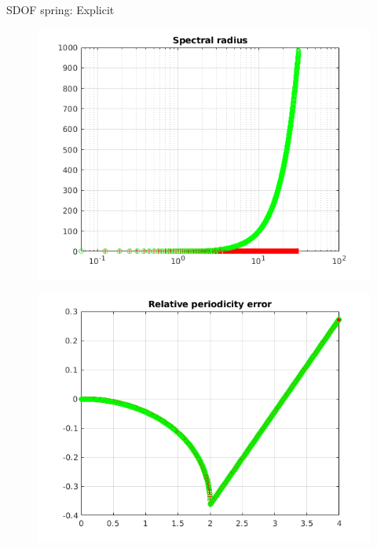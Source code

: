\begin{frame}{SDOF spring: Explicit}
\begin{figure}[ht]
\begin{minipage}[b]{0.5\linewidth}
  \end{minipage}%
  \begin{minipage}[b]{0.5\linewidth}
    \centering
    \includegraphics[scale=.35]{images/sdof-exp-2.png} \\
  \end{minipage} 
  \begin{minipage}[b]{0.5\linewidth}
    \centering
    \includegraphics[scale=.35]{images/sdof-exp-3.png} \\


\end{minipage}
\end{figure}
\end{frame}
